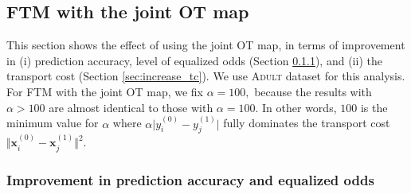 \documentclass[10pt]{article} %
\begin{document}
\subsection{FTM with the joint OT map}\label{sec:various_T}

This section shows the effect of using the joint OT map, in terms of improvement in (i) prediction accuracy, level of equalized odds (Section \ref{sec:partial_improve}), and (ii) the transport cost (Section \ref{sec:increase_tc}).
We use \textsc{Adult} dataset for this analysis.
For FTM with the joint OT map, we fix $\alpha = 100,$ because the results with $\alpha > 100$ are almost identical to those with $\alpha = 100.$
In other words, $100$ is the minimum value for $\alpha$ where $\alpha \vert y_{i}^{(0)} - y_{j}^{(1)} \vert$ fully dominates the transport cost $\Vert \mathbf{x}_{i}^{(0)} - \mathbf{x}_{j}^{(1)} \Vert^{2}.$

\subsubsection{Improvement in prediction accuracy and equalized odds}\label{sec:partial_improve}
\end{document}
